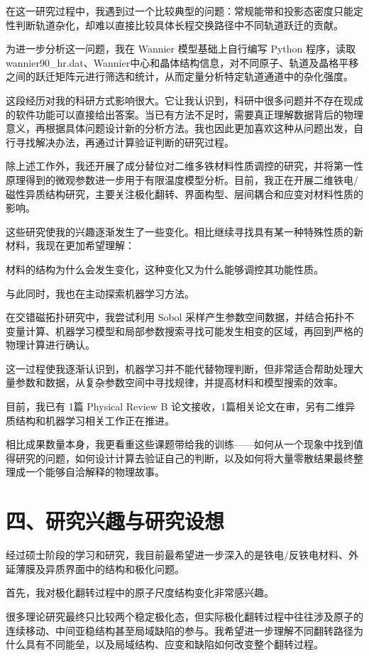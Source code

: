 在这一研究过程中，我遇到过一个比较典型的问题：常规能带和投影态密度只能定性判断轨道杂化，却难以直接比较具体长程交换路径中不同轨道跃迁的贡献。

为进一步分析这一问题，我在 Wannier 模型基础上自行编写 Python 程序，读取 wannier90\_hr.dat、Wannier中心和晶体结构信息，对不同原子、轨道及晶格平移之间的跃迁矩阵元进行筛选和统计，从而定量分析特定轨道通道中的杂化强度。

这段经历对我的科研方式影响很大。它让我认识到，科研中很多问题并不存在现成的软件功能可以直接给出答案。当已有方法不足时，需要真正理解数据背后的物理意义，再根据具体问题设计新的分析方法。我也因此更加喜欢这种从问题出发，自行寻找解决办法，再通过计算验证判断的研究过程。

除上述工作外，我还开展了成分替位对二维多铁材料性质调控的研究，并将第一性原理得到的微观参数进一步用于有限温度模型分析。目前，我正在开展二维铁电/磁性异质结构研究，主要关注极化翻转、界面构型、层间耦合和应变对材料性质的影响。

这些研究使我的兴趣逐渐发生了一些变化。相比继续寻找具有某一种特殊性质的新材料，我现在更加希望理解：

材料的结构为什么会发生变化，这种变化又为什么能够调控其功能性质。

与此同时，我也在主动探索机器学习方法。

在交错磁拓扑研究中，我尝试利用 Sobol 采样产生参数空间数据，并结合拓扑不变量计算、机器学习模型和局部参数搜索寻找可能发生相变的区域，再回到严格的物理计算进行确认。

这一过程使我逐渐认识到，机器学习并不能代替物理判断，但非常适合帮助处理大量参数和数据，从复杂参数空间中寻找规律，并提高材料和模型搜索的效率。

目前，我已有 1篇 Physical Review B 论文接收，1篇相关论文在审，另有二维异质结构和机器学习相关工作正在推进。

相比成果数量本身，我更看重这些课题带给我的训练——如何从一个现象中找到值得研究的问题，如何设计计算去验证自己的判断，以及如何将大量零散结果最终整理成一个能够自洽解释的物理故事。

\section{四、研究兴趣与研究设想}

经过硕士阶段的学习和研究，我目前最希望进一步深入的是铁电/反铁电材料、外延薄膜及异质界面中的结构和极化问题。

首先，我对极化翻转过程中的原子尺度结构变化非常感兴趣。

很多理论研究最终只比较两个稳定极化态，但实际极化翻转过程中往往涉及原子的连续移动、中间亚稳结构甚至局域缺陷的参与。我希望进一步理解不同翻转路径为什么具有不同能垒，以及局域结构、应变和缺陷如何改变整个翻转过程。

